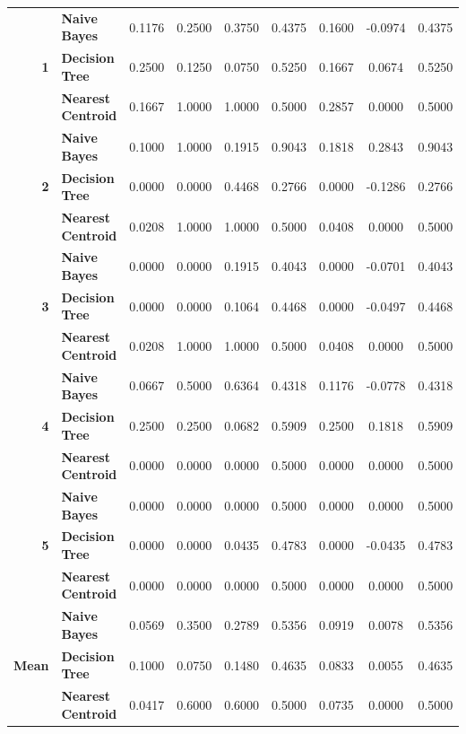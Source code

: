 \begin{center}
\begin{longtable}{ | r  l | c | c | c | c | c | c | c | }
\multirow{3}{*}{\textbf{1}} & \textbf{Naive Bayes} & 
0.1176 & 0.2500 & 0.3750 & 0.4375 & 0.1600 & -0.0974 & 0.4375 \\
& \textbf{Decision Tree} & 
0.2500 & 0.1250 & 0.0750 & 0.5250 & 0.1667 &  0.0674 & 0.5250 \\
& \textbf{Nearest Centroid} &
0.1667 & 1.0000 & 1.0000 & 0.5000 & 0.2857 &  0.0000 & 0.5000 \\
\hline
\multirow{3}{*}{\textbf{2}} & \textbf{Naive Bayes} & 
0.1000 & 1.0000 & 0.1915 & 0.9043 & 0.1818 &  0.2843 & 0.9043 \\
& \textbf{Decision Tree} & 
0.0000 & 0.0000 & 0.4468 & 0.2766 & 0.0000 & -0.1286 & 0.2766 \\
& \textbf{Nearest Centroid} &
0.0208 & 1.0000 & 1.0000 & 0.5000 & 0.0408 &  0.0000 & 0.5000 \\
\hline
\multirow{3}{*}{\textbf{3}} & \textbf{Naive Bayes} & 
0.0000 & 0.0000 & 0.1915 & 0.4043 & 0.0000 & -0.0701 & 0.4043 \\
& \textbf{Decision Tree} & 
0.0000 & 0.0000 & 0.1064 & 0.4468 & 0.0000 & -0.0497 & 0.4468 \\
& \textbf{Nearest Centroid} &
0.0208 & 1.0000 & 1.0000 & 0.5000 & 0.0408 &  0.0000 & 0.5000 \\
\hline
\multirow{3}{*}{\textbf{4}} & \textbf{Naive Bayes} & 
0.0667 & 0.5000 & 0.6364 & 0.4318 & 0.1176 & -0.0778 & 0.4318 \\
& \textbf{Decision Tree} & 
0.2500 & 0.2500 & 0.0682 & 0.5909 & 0.2500 &  0.1818 & 0.5909 \\
& \textbf{Nearest Centroid} &
0.0000 & 0.0000 & 0.0000 & 0.5000 & 0.0000 &  0.0000 & 0.5000 \\
\hline
\multirow{3}{*}{\textbf{5}} & \textbf{Naive Bayes} & 
0.0000 & 0.0000 & 0.0000 & 0.5000 & 0.0000 &  0.0000 & 0.5000 \\
& \textbf{Decision Tree} & 
0.0000 & 0.0000 & 0.0435 & 0.4783 & 0.0000 & -0.0435 & 0.4783 \\
& \textbf{Nearest Centroid} &
0.0000 & 0.0000 & 0.0000 & 0.5000 & 0.0000 &  0.0000 & 0.5000 \\
\hline
\hline
\multirow{3}{*}{\textbf{Mean}} & \textbf{Naive Bayes} & 
0.0569 & 0.3500 & 0.2789 & 0.5356 & 0.0919 &  0.0078 & 0.5356 \\
& \textbf{Decision Tree} & 
0.1000 & 0.0750 & 0.1480 & 0.4635 & 0.0833 &  0.0055 & 0.4635 \\
& \textbf{Nearest Centroid} &
0.0417 & 0.6000 & 0.6000 & 0.5000 & 0.0735 &  0.0000 & 0.5000 \\
\hline
\end{longtable}
\end{center}

